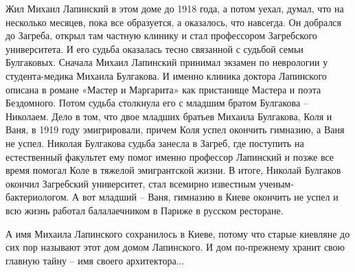 Жил Михаил Лапинский в этом доме до 1918 года, а потом уехал, думал, что на
несколько месяцев, пока все образуется, а оказалось, что навсегда. Он добрался
до Загреба, открыл там частную клинику и стал профессором Загребского
университета. И его судьба оказалась тесно связанной  с судьбой семьи
Булгаковых. Сначала Михаил Лапинский принимал экзамен по неврологии у
студента-медика Михаила Булгакова. И именно клиника доктора Лапинского описана
в романе «Мастер и Маргарита» как пристанище Мастера и поэта Бездомного. Потом
судьба столкнула его с младшим братом Булгакова – Николаем. Дело в том, что
двое младших братьев Михаила Булгакова, Коля и Ваня, в 1919 году эмигрировали,
причем Коля успел окончить гимназию,  а Ваня не успел. Николая Булгакова судьба
занесла в Загреб, где поступить на естественный факультет ему помог именно
профессор Лапинский и позже  все время помогал Коле в тяжелой эмигрантской
жизни. В итоге, Николай Булгаков окончил Загребский университет, стал всемирно
известным ученым\hyp бактериологом.  А вот младший – Ваня, гимназию в Киеве
окончить не успел и всю жизнь работал балалаечником в Париже в русском
ресторане. 

А имя Михаила Лапинского сохранилось в Киеве, потому что старые киевляне до сих
пор называют этот дом домом Лапинского. И дом по-прежнему хранит свою главную
тайну – имя своего архитектора...

